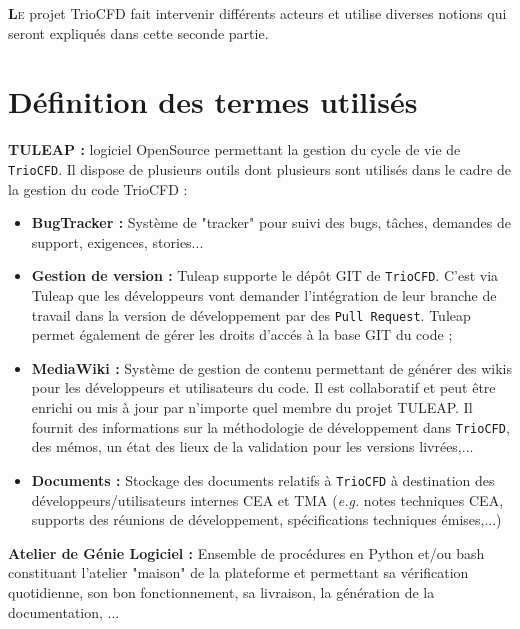 
\lettrine[lines=2,slope=0pt,nindent=4pt]{\textbf{L}}{e} projet TrioCFD fait intervenir diff\'erents acteurs et
utilise diverses notions qui seront expliqu\'es dans cette seconde partie.

\chapter{\label{chapitre:termes}D\'efinition des termes utilis\'es}

\textbf{TULEAP :} logiciel OpenSource permettant la gestion du cycle de vie de \texttt{TrioCFD}. Il dispose de plusieurs outils
dont plusieurs sont utilis\'es dans le cadre de la gestion du code TrioCFD : \smallskip
\begin{itemize}[label=$\Rightarrow$, font=\LARGE]
  \item \textbf{BugTracker :} Syst\`eme de "tracker" pour suivi des bugs, t\^aches, demandes de support, exigences, stories...
  \item \textbf{Gestion de version :} Tuleap supporte le d\'ep\^ot GIT de \texttt{TrioCFD}. C'est via Tuleap que les d\'eveloppeurs vont demander l'int\'egration de leur branche de travail dans la version de d\'eveloppement par des \texttt{Pull Request}. Tuleap permet \'egalement de g\'erer les droits d'acc\'es \`a la base GIT du code ;
  \item \textbf{MediaWiki :} Syst\`eme de gestion de contenu permettant de générer des wikis pour les d\'eveloppeurs et utilisateurs du code. Il est collaboratif et peut \^etre enrichi ou mis \`a jour par n'importe quel membre du projet TULEAP. Il fournit des informations sur la m\'ethodologie de d\'eveloppement dans \texttt{TrioCFD}, des m\'emos, un \'etat des lieux de la validation pour les versions livr\'ees,...
  \item \textbf{Documents :} Stockage des documents relatifs \`a \texttt{TrioCFD} \`a destination des d\'eveloppeurs/utilisateurs internes CEA et TMA (\textit{e.g.} notes techniques CEA, supports des r\'eunions de d\'eveloppement, sp\'ecifications techniques \'emises,...)
\end{itemize}\smallskip

\textbf{Atelier de G\'enie Logiciel :} Ensemble de proc\'edures en Python et/ou bash constituant l'atelier "maison" de la plateforme et permettant sa v\'erification quotidienne, son bon fonctionnement, sa livraison, la g\'en\'eration de la documentation, ... \smallskip\newline

